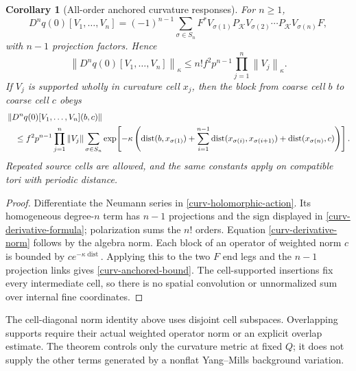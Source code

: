 \documentclass[11pt]{article}
\newtheorem{corollary}[theorem]{Corollary}
\theoremstyle{remark}
\newcommand{\norm}[1]{\left\|#1\right\|}
\begin{document}
\begin{corollary}[All-order anchored curvature responses]
\label{curv-all-orders}
For $n\ge1$,
\begin{equation}\label{curv-derivative-formula}
 D^nq(0)[V_1,\ldots,V_n]
   =(-1)^{n-1}\sum_{\sigma\in S_n}
       F^*V_{\sigma(1)}P_{\mathcal K}V_{\sigma(2)}
       \cdots P_{\mathcal K}V_{\sigma(n)}F,
\end{equation}
with $n-1$ projection factors. Hence
\begin{equation}\label{curv-derivative-norm}
 \norm{D^nq(0)[V_1,\ldots,V_n]}_\kappa
       \le n!f^2p^{n-1}\prod_{j=1}^n\norm{V_j}_\kappa.
\end{equation}
If $V_j$ is supported wholly in curvature cell $x_j$, then the
block from coarse cell $b$ to coarse cell $c$ obeys
\begin{align}
 &\norm{D^nq(0)[V_1,\ldots,V_n](b,c)}\notag\\
 &\quad\le f^2p^{n-1}\prod_{j=1}^n\norm{V_j}
       \sum_{\sigma\in S_n}
       \exp\!\left[-\kappa\left(
          \operatorname{dist}(b,x_{\sigma(1)})
          +\sum_{i=1}^{n-1}\operatorname{dist}
                   (x_{\sigma(i)},x_{\sigma(i+1)})
          +\operatorname{dist}(x_{\sigma(n)},c)
                       \right)\right].
                       \label{curv-anchored-bound}
\end{align}
Repeated source cells are allowed, and the same constants apply
on compatible tori with periodic distance.
\end{corollary}

\begin{proof}
Differentiate the Neumann series in
\eqref{curv-holomorphic-action}. Its homogeneous degree-$n$ term
has $n-1$ projections and the sign displayed in
\eqref{curv-derivative-formula}; polarization sums the $n!$
orders. Equation \eqref{curv-derivative-norm} follows by the algebra
norm. Each block of an operator of weighted norm $c$ is bounded
by $ce^{-\kappa\operatorname{dist}}$. Applying this to the two
$F$ end legs and the $n-1$ projection links gives
\eqref{curv-anchored-bound}. The cell-supported insertions fix
every intermediate cell, so there is no spatial convolution
or unnormalized sum over internal fine coordinates.
\end{proof}

The cell-diagonal norm identity above uses disjoint cell subspaces.
Overlapping supports require their actual weighted operator norm
or an explicit overlap estimate. The theorem controls only the
curvature metric at fixed $Q$; it does not supply the other terms
generated by a nonflat Yang--Mills background variation.
\end{document}
